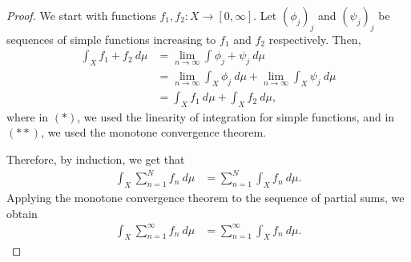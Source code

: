 \documentclass[10pt]{mypackage}
\begin{document}
\begin{proof}
  We start with functions $f_1,f_2\colon X\rightarrow [0,\infty]$. Let $\left( \phi_j \right)_j$ and $\left( \psi_j \right)_j$ be sequences of simple functions increasing to $f_1$ and $f_2$ respectively. Then,
  \begin{align*}
    \int_{X}^{} f_1 + f_2\:d\mu &= \lim_{n\rightarrow\infty} \int_{}^{} \phi_j + \psi_j\:d\mu\\
                                &= \lim_{n\rightarrow\infty} \int_{X}^{} \phi_j\:d\mu + \lim_{n\rightarrow\infty} \int_{X}^{} \psi_j\:d\mu\tag{$\ast$}\\
                                &= \int_{X}^{} f_1\:d\mu + \int_{X}^{} f_2\:d\mu, \tag{$\ast\ast$}
  \end{align*}
  where in $(\ast)$, we used the linearity of integration for simple functions, and in $(\ast\ast)$, we used the monotone convergence theorem.\newline

  Therefore, by induction, we get that
  \begin{align*}
    \int_{X}^{} \sum_{n=1}^{N}f_n\:d\mu &= \sum_{n=1}^{N} \int_{X}^{} f_n\:d\mu.
  \end{align*}
  Applying the monotone convergence theorem to the sequence of partial sums, we obtain
  \begin{align*}
    \int_{X}^{} \sum_{n=1}^{\infty}f_n\:d\mu &= \sum_{n=1}^{\infty} \int_{X}^{} f_n\:d\mu.
  \end{align*}
\end{proof}
\end{document}

